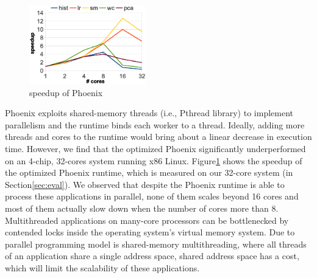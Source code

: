 



\begin{figure}[!h!t]  
	\centering
	\includegraphics[width=0.45\textwidth]{eps/phoenix_speedup.eps}
	\caption{speedup of Phoenix}
	\label{fig:phoenix:speedup}
\end{figure}

Phoenix exploits shared-memory threads (i.e., Pthread library) to implement parallelism and the runtime binds each worker to a thread.
Ideally, adding more threads and cores to the runtime would bring about a linear decrease in execution time.
However, we find that the optimized Phoenix\cite{yoo2009phoenix2} significantly underperformed on an 4-chip, 32-cores system running x86 Linux.
Figure\ref{fig:phoenix:speedup} shows the speedup of the optimized Phoenix runtime, which is measured on our 32-core system (in Section\ref{sec:eval}). 
We observed that despite the Phoenix runtime is able to process these applications in parallel, none of them scales beyond 16 cores and most of them actually slow down when the number of cores more than 8.
Multithreaded applications on many-core processors can be bottlenecked by contended locks inside the operating system’s virtual memory system\cite{Clements2013RadixVM}.
Due to parallel programming model is shared-memory multithreading, where all threads of an application share a single address space, shared address space has a cost, which will limit the scalability of these applications.
 

